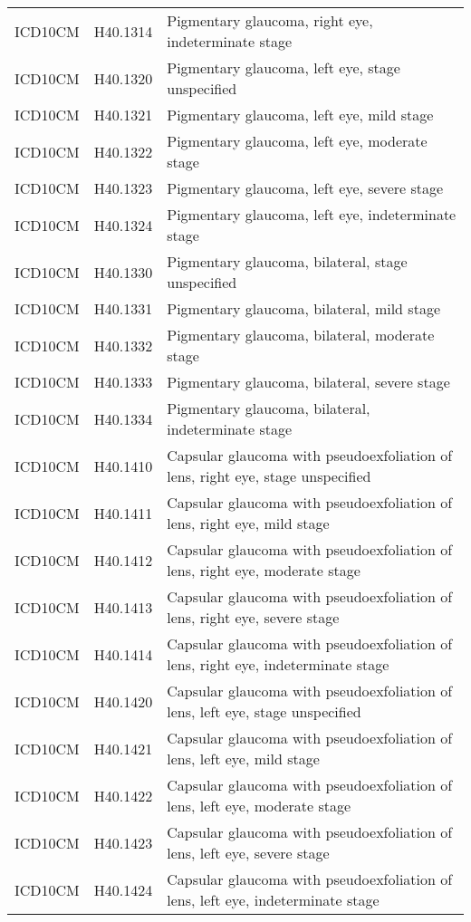 \begin{longtable}{p{}p{}p{}}
  ICD10CM & H40.1314 & Pigmentary glaucoma, right eye, indeterminate stage \\ 
  ICD10CM & H40.1320 & Pigmentary glaucoma, left eye, stage unspecified \\ 
  ICD10CM & H40.1321 & Pigmentary glaucoma, left eye, mild stage \\ 
  ICD10CM & H40.1322 & Pigmentary glaucoma, left eye, moderate stage \\ 
  ICD10CM & H40.1323 & Pigmentary glaucoma, left eye, severe stage \\ 
  ICD10CM & H40.1324 & Pigmentary glaucoma, left eye, indeterminate stage \\ 
  ICD10CM & H40.1330 & Pigmentary glaucoma, bilateral, stage unspecified \\ 
  ICD10CM & H40.1331 & Pigmentary glaucoma, bilateral, mild stage \\ 
  ICD10CM & H40.1332 & Pigmentary glaucoma, bilateral, moderate stage \\ 
  ICD10CM & H40.1333 & Pigmentary glaucoma, bilateral, severe stage \\ 
  ICD10CM & H40.1334 & Pigmentary glaucoma, bilateral, indeterminate stage \\ 
  ICD10CM & H40.1410 & Capsular glaucoma with pseudoexfoliation of lens, right eye, stage unspecified \\ 
  ICD10CM & H40.1411 & Capsular glaucoma with pseudoexfoliation of lens, right eye, mild stage \\ 
  ICD10CM & H40.1412 & Capsular glaucoma with pseudoexfoliation of lens, right eye, moderate stage \\ 
  ICD10CM & H40.1413 & Capsular glaucoma with pseudoexfoliation of lens, right eye, severe stage \\ 
  ICD10CM & H40.1414 & Capsular glaucoma with pseudoexfoliation of lens, right eye, indeterminate stage \\ 
  ICD10CM & H40.1420 & Capsular glaucoma with pseudoexfoliation of lens, left eye, stage unspecified \\ 
  ICD10CM & H40.1421 & Capsular glaucoma with pseudoexfoliation of lens, left eye, mild stage \\ 
  ICD10CM & H40.1422 & Capsular glaucoma with pseudoexfoliation of lens, left eye, moderate stage \\ 
  ICD10CM & H40.1423 & Capsular glaucoma with pseudoexfoliation of lens, left eye, severe stage \\ 
  ICD10CM & H40.1424 & Capsular glaucoma with pseudoexfoliation of lens, left eye, indeterminate stage \\ 

\end{longtable}
